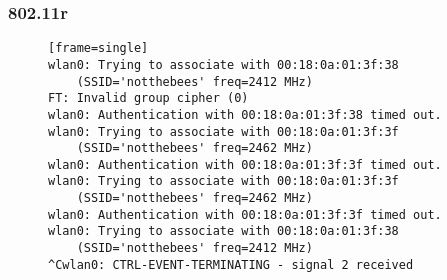 \subsubsection{802.11r}
\label{sec:testing-output;sub:80211r}
\begin{figure}[h!]
\begin{verbatim}[frame=single]
wlan0: Trying to associate with 00:18:0a:01:3f:38
    (SSID='notthebees' freq=2412 MHz)
FT: Invalid group cipher (0)
wlan0: Authentication with 00:18:0a:01:3f:38 timed out.
wlan0: Trying to associate with 00:18:0a:01:3f:3f
    (SSID='notthebees' freq=2462 MHz)
wlan0: Authentication with 00:18:0a:01:3f:3f timed out.
wlan0: Trying to associate with 00:18:0a:01:3f:3f
    (SSID='notthebees' freq=2462 MHz)
wlan0: Authentication with 00:18:0a:01:3f:3f timed out.
wlan0: Trying to associate with 00:18:0a:01:3f:38
    (SSID='notthebees' freq=2412 MHz)
^Cwlan0: CTRL-EVENT-TERMINATING - signal 2 received
\end{verbatim}
\end{figure}
